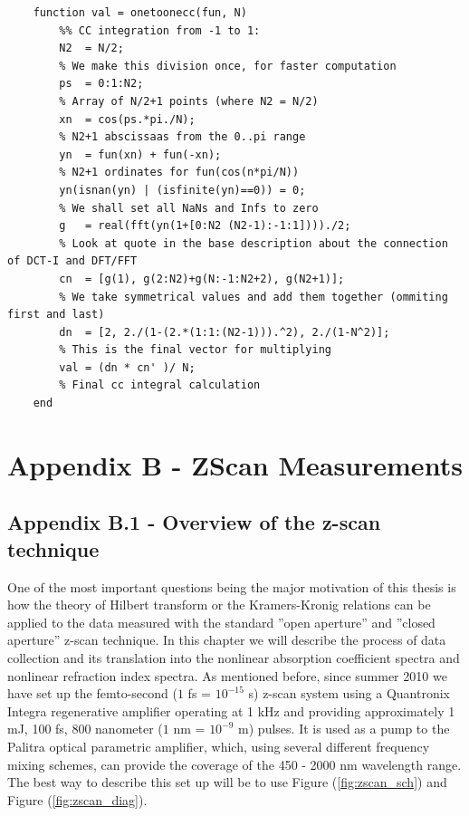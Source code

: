 \documentclass[12pt,twoside,a4paper]{article}
\numberwithin{equation}{subsection}
\numberwithin{figure}{subsection}
\begin{document}
\begin{lstlisting}
	function val = onetoonecc(fun, N)
	    %% CC integration from -1 to 1:
	    N2  = N/2;                                           
	    % We make this division once, for faster computation
	    ps  = 0:1:N2;                                        
	    % Array of N/2+1 points (where N2 = N/2)
	    xn  = cos(ps.*pi./N);                                
	    % N2+1 abscissaas from the 0..pi range
	    yn  = fun(xn) + fun(-xn);                            
	    % N2+1 ordinates for fun(cos(n*pi/N))
	    yn(isnan(yn) | (isfinite(yn)==0)) = 0;               
	    % We shall set all NaNs and Infs to zero
	    g   = real(fft(yn(1+[0:N2 (N2-1):-1:1])))./2;        
	    % Look at quote in the base description about the connection of DCT-I and DFT/FFT
	    cn  = [g(1), g(2:N2)+g(N:-1:N2+2), g(N2+1)];         
	    % We take symmetrical values and add them together (ommiting first and last)
	    dn  = [2, 2./(1-(2.*(1:1:(N2-1))).^2), 2./(1-N^2)];  
	    % This is the final vector for multiplying
	    val = (dn * cn' )/ N;                                
	    % Final cc integral calculation
	end
\end{lstlisting}

\section*{Appendix B - ZScan Measurements} \label{chap:zscan}
\subsection*{Appendix B.1 - Overview of the z-scan technique} \label{chap:zscan_overview}

One of the most important questions being the major motivation of this thesis is how the theory of Hilbert transform or the
Kramers-Kronig relations can be applied to the data measured with the standard ''open aperture'' and ''closed aperture'' z-scan
technique. In this chapter we will describe the process of data collection and its translation into the nonlinear absorption
coefficient spectra and nonlinear refraction index spectra. As mentioned before, since summer 2010 we have set up the femto-second
($1$ fs = $10^{-15}$ s) z-scan system using a Quantronix Integra regenerative amplifier operating at 1 kHz and providing
approximately 1 mJ, 100 fs, 800 nanometer ($1$ nm = $10^{-9}$ m) pulses. It is used as a pump to the Palitra optical parametric amplifier,
which, using several different frequency mixing schemes, can provide the coverage of the 450 - 2000 nm wavelength range. The best way to
describe this set up will be to use Figure (\ref{fig:zscan_sch}) and Figure (\ref{fig:zscan_diag}).
\end{document}
